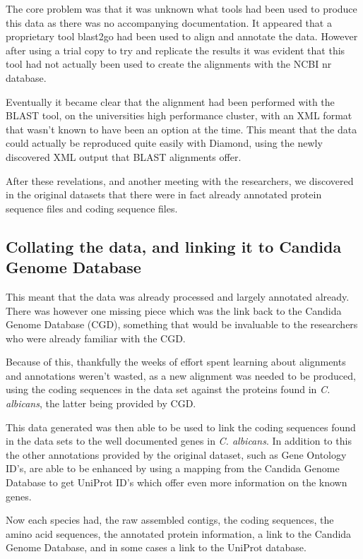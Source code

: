 The core problem was that it was unknown what tools had been used to produce this data as there was no accompanying documentation. It appeared that a proprietary tool blast2go\cite{blast2go} had been used to align and annotate the data. However after using a trial copy to try and replicate the results it was evident that this tool had not actually been used to create the alignments with the NCBI nr database. 

Eventually it became clear that the alignment had been performed with the BLAST tool, on the universities high performance cluster, with an XML format that wasn't known to have been an option at the time. This meant that the data could actually be reproduced quite easily with Diamond, using the newly discovered XML output that BLAST alignments offer.

After these revelations, and another meeting with the researchers, we discovered in the original datasets that there were in fact already annotated protein sequence files and coding sequence files.

\subsection{Collating the data, and linking it to Candida Genome Database}
This meant that the data was already processed and largely annotated already. There was however one missing piece which was the link back to the Candida Genome Database (CGD), something that would be invaluable to the researchers who were already familiar with the CGD. 

Because of this, thankfully the weeks of effort spent learning about alignments and annotations weren't wasted, as a new alignment was needed to be produced, using the coding sequences in the data set against the proteins found in \textit{C. albicans}, the latter being provided by CGD\cite{albicans}. 

This data generated was then able to be used to link the coding sequences found in the data sets to the well documented genes in \textit{C. albicans}. In addition to this the other annotations provided by the original dataset, such as Gene Ontology ID's, are able to be enhanced by using a mapping from the Candida Genome Database to get UniProt ID's which offer even more information on the known genes. 

Now each species had, the raw assembled contigs, the coding sequences, the amino acid sequences, the annotated protein information, a link to the Candida Genome Database, and in some cases a link to the UniProt database.


